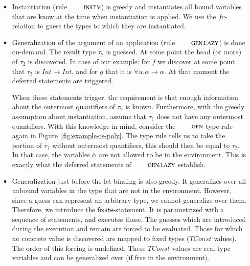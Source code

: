 \documentclass[preprint,natbib]{sigplanconf}
\newcommand{\Conid}[1]{\mathit{#1}}
\newcommand{\Varid}[1]{\mathit{#1}}
\newcommand\Fixate{\mathsf{fixate}}
\begin{document}
    \begin{itemize} 
    \item Instantiation (rule $\RefTirName{INST.V}$)
    is greedy and instantiates all bound variables that are know at
    the time when instantiation is applied. We use the \ensuremath{\Varid{fr}}-relation
    to guess the types to which they are instantiated.
    \item Generalization of the argument of an application (rule
    $\RefTirName{GEN.LAZY}$) is done on-demand. The result type
    $\tau_2$ is guessed. At some point the head (or more) of $\tau_2$
    is discovered. In case of our example: for \ensuremath{\Varid{f}} we
    discover at some point that $\tau_2$ is \ensuremath{\Conid{Int}\to \Conid{Int}}, and for \ensuremath{\Varid{g}}
    that it is $\forall \alpha . \alpha \rightarrow \alpha$. At that
    moment the deferred statements are triggered.  

    When these statements trigger, the requirement is that enough
    information about the outermost quantifiers of $\tau_2$ is known.
    Furthermore, with the greedy assumption about instantiation,
    assume that $\tau_1$ does not have any outermost quantifiers. With
    this knowledge in mind, consider the $\RefTirName{GEN}$ type rule
    again in Figure~\ref{fig:example-ts-poly}. The type rule tells us
    to take the portion of $\tau_1$ without outermost quantifiers,
    this should then be equal to $\tau_2$. In that case, the variables
    $\overline{\alpha}$ are not allowed to be in the environment. This
    is exactly what the deferred statements of $\RefTirName{GEN.LAZY}$
    establish.
    \item Generalization just before the let-binding is also
    greedy. It generalizes over all unbound variables in the type that
    are not in the environment. However, since a guess can represent
    an arbitrary type, we cannot generalize over them. Therefore, we
    introduce the $\Fixate$-statement. It is parametrized with a
    sequence of statements, and executes those.  The guesses
    which are introduced during the execution and remain are forced to be
    evaluated. Those for which no concrete value is discovered are
    mapped to fixed types (\ensuremath{\Conid{TConst}} values). The order of this forcing
    is undefined. These \ensuremath{\Conid{TConst}} values are real type variables and
    can be generalized over (if free in the environment).
    \end{itemize}
\end{document}
